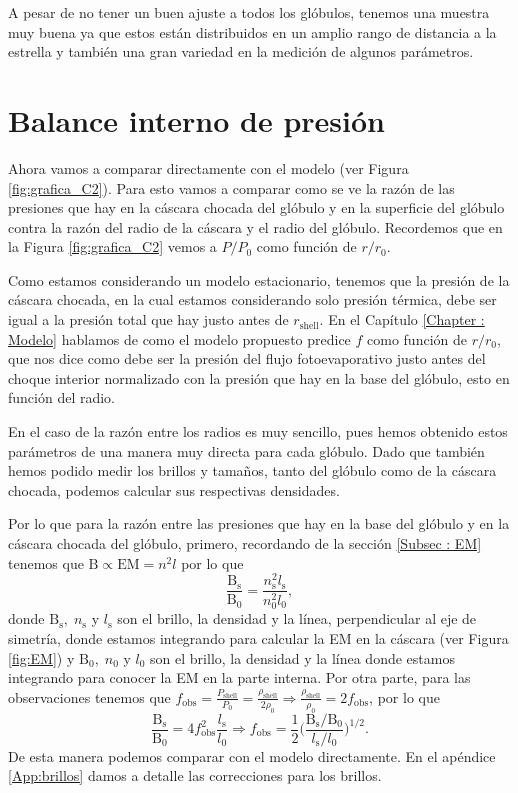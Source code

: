 \documentclass{book}
\begin{document}
A pesar de no tener un buen ajuste a todos los glóbulos, tenemos una
muestra muy buena ya que estos están distribuidos en un amplio rango
de distancia a la estrella y también una gran variedad en la medición
de algunos parámetros.

\section{Balance interno de presión}\label{Sec : comparacion-modelo}

Ahora vamos a comparar directamente con el modelo (ver Figura
\ref{fig:grafica_C2}). Para esto vamos a comparar como se ve la razón
de las presiones que hay en la cáscara chocada del glóbulo y en la
superficie del glóbulo contra la razón del radio de la cáscara y el
radio del glóbulo. Recordemos que en la Figura \ref{fig:grafica_C2}
vemos a $P/P_0$ como función de $r/r_0$.

Como estamos considerando un modelo estacionario, tenemos que la
presión de la cáscara chocada, en la cual estamos considerando solo
presión térmica, debe ser igual a la presión total que hay justo antes
de $r_\mathrm{shell}$. En el Capítulo \ref{Chapter : Modelo} hablamos
de como el modelo propuesto predice $f$ como función de $r/r_0$, que
nos dice como debe ser la presión del flujo fotoevaporativo justo
antes del choque interior normalizado con la presión que hay en la
base del glóbulo, esto en función del radio.

En el caso de la razón entre los radios es muy sencillo, pues hemos
obtenido estos parámetros de una manera muy directa para cada glóbulo.
Dado que también hemos podido medir los brillos y tamaños, tanto del
glóbulo como de la cáscara chocada, podemos calcular sus respectivas
densidades.

Por lo que para la razón entre las presiones que hay en la base del
glóbulo y en la cáscara chocada del glóbulo, primero, recordando de la
sección \ref{Subsec : EM} tenemos que
$\mathrm{B}\propto \mathrm{EM}=n^2l$ por lo que
\begin{equation}
\frac{\mathrm{B_\mathrm{s}}}{\mathrm{B_0}}=\frac{n_\mathrm{s}^2l_\mathrm{s}}{n_0^2l_0},
\end{equation}
donde $\mathrm{B_\mathrm{s}}, \; n_\mathrm{s}$ y $l_\mathrm{s}$ son el
brillo, la densidad y la línea, perpendicular al eje de simetría,
donde estamos integrando para calcular la EM en la cáscara (ver Figura
\ref{fig:EM}) y $\mathrm{B_0}, \; n_0$ y $l_0$ son el brillo, la
densidad y la línea donde estamos integrando para conocer la EM en la
parte interna. Por otra parte, para las observaciones tenemos que
$f_\mathrm{obs} =
\frac{P_\mathrm{shell}}{P_0}=\frac{\rho_\mathrm{shell}}{2\rho_0} \Rightarrow
\frac{\rho_\mathrm{shell}}{\rho_0}=2f_\mathrm{obs}$, por lo que
\begin{equation}
\frac{\mathrm{B_\mathrm{s}}}{\mathrm{B_0}}=4f_\mathrm{obs}^2\frac{l_\mathrm{s}}{l_0}\Rightarrow f_\mathrm{obs}= \frac{1}{2}\Big(\frac{\mathrm{B_\mathrm{s}}/\mathrm{B_0}}{l_\mathrm{s}/l_0}\Big)^{1/2}.
\end{equation}
De esta manera podemos comparar con el modelo directamente. En el
apéndice \ref{App:brillos} damos a detalle las correcciones para los
brillos.
\end{document}
